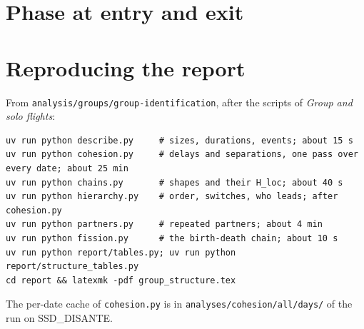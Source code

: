 \section{Phase at entry and exit}\label{app:phases}

\begin{table}[H]
\centering\footnotesize

\caption{Phase at the instant of entering or leaving a group, and shares of time in each phase
(percent, with 5--95\% bands; 1~Hz flights).}
\label{tab:phases}
\end{table}

\section{Reproducing the report}\label{app:reproduce}

From \texttt{analysis/groups/group-identification}, after the scripts of \emph{Group and solo flights}:
\begin{verbatim}
uv run python describe.py     # sizes, durations, events; about 15 s
uv run python cohesion.py     # delays and separations, one pass over every date; about 25 min
uv run python chains.py       # shapes and their H_loc; about 40 s
uv run python hierarchy.py    # order, switches, who leads; after cohesion.py
uv run python partners.py     # repeated partners; about 4 min
uv run python fission.py      # the birth-death chain; about 10 s
uv run python report/tables.py; uv run python report/structure_tables.py
cd report && latexmk -pdf group_structure.tex
\end{verbatim}
The per-date cache of \texttt{cohesion.py} is in \texttt{analyses/cohesion/all/days/} of the run on SSD\_DISANTE.

